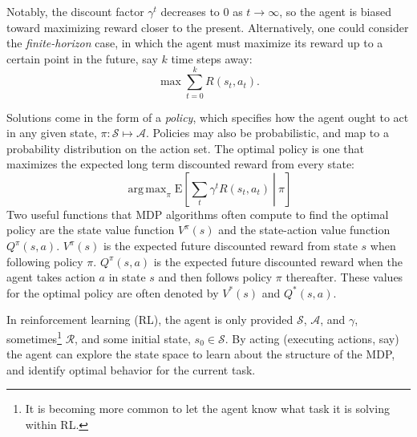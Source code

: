 \documentclass[11pt]{article}
\DeclareMathOperator*{\argmax}{arg\,max}
\begin{document}
Notably, the discount factor $\gamma^t$ decreases to $0$ as $t \rightarrow \infty$, so the agent is biased toward maximizing reward closer to the present. Alternatively, one could consider the {\it finite-horizon} case, in which the agent must maximize its reward up to a certain point in the future, say $k$ time steps away:
\begin{equation}
\max \sum_{t=0}^{k} R(s_t,a_t).
\end{equation}

Solutions come in the form of a {\it policy}, which specifies how the agent ought to act in any given state, $\pi : \mathcal{S} \mapsto \mathcal{A}$. Policies may also be probabilistic, and map to a probability distribution on the action set.
The optimal policy is one that maximizes the expected long term discounted reward from every state:
\begin{equation}
\argmax_\pi \left.\text{E}\left[\sum_t \gamma^t R(s_t,a_t)\ \right|\ \pi\right]
\end{equation}
Two useful functions that MDP algorithms often compute to find the optimal policy are the state value function $V^{\pi}(s)$ and the state-action value function $Q^{\pi}(s, a)$. $V^{\pi}(s)$ is the expected future discounted reward from state $s$ when following policy $\pi$. $Q^{\pi}(s, a)$ is the expected future discounted reward when the agent takes action $a$ in state $s$ and then follows policy $\pi$ thereafter. These values for the optimal policy are often denoted by $V^*(s)$ and $Q^*(s, a)$.


In reinforcement learning (RL), the agent is only provided $\mathcal{S}$, $\mathcal{A}$, and $\gamma$, sometimes\footnote{It is becoming more common to let the agent know what task it is solving within RL.} $\mathcal{R}$, and some initial state, $s_0 \in \mathcal{S}$. By acting (executing actions, say) the agent can explore the state space to learn about the structure of the MDP, and identify optimal behavior for the current task.

\end{document}
